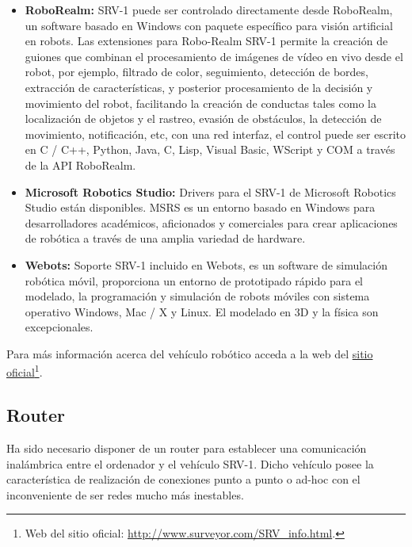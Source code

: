 \begin{itemize}

\item \textbf{RoboRealm:}  SRV-1 puede ser controlado directamente desde RoboRealm, un software basado en Windows con paquete específico para visión artificial en robots. Las extensiones para Robo-Realm SRV-1 permite la creación de guiones que combinan el procesamiento de imágenes de vídeo en vivo desde el robot, por ejemplo, filtrado de color, seguimiento, detección de bordes, extracción de características, y posterior procesamiento de la decisión y movimiento del robot, facilitando la creación de conductas tales como la localización de objetos y el rastreo, evasión de obstáculos, la detección de movimiento, notificación, etc, con una red interfaz, el control puede ser escrito en C / C++, Python, Java, C, Lisp, Visual Basic, WScript y COM a través de la API RoboRealm. 

\item \textbf{Microsoft Robotics Studio:}  Drivers para el SRV-1 de Microsoft Robotics Studio están disponibles. MSRS es un entorno basado en Windows para desarrolladores académicos, aficionados y comerciales para crear aplicaciones de robótica a través de una amplia variedad de hardware. 

\item \textbf{Webots:} Soporte SRV-1 incluido en Webots, es un software de simulación robótica móvil, proporciona un entorno de prototipado rápido para el modelado, la programación y simulación de robots móviles con sistema operativo Windows, Mac / X y Linux. El modelado en 3D y la física son excepcionales. 

\end{itemize}

Para más información acerca del vehículo robótico acceda a la web del \href{http://www.surveyor.com/SRV\_info.html}{sitio oficial}\footnote{Web del sitio oficial: \url{http://www.surveyor.com/SRV\_info.html}.}.

\subsection{Router}

Ha sido necesario disponer de un router para establecer una comunicación inalámbrica entre el ordenador y el vehículo SRV-1. Dicho vehículo posee la característica de realización de conexiones punto a punto o ad-hoc con el inconveniente de ser redes mucho más inestables. \\

